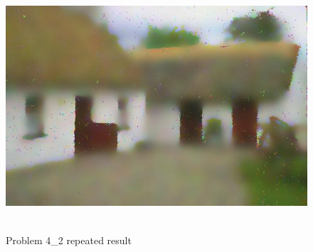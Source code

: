 \documentclass{article}
\begin{document}
\begin{figure}[!h]
  \centering
    \includegraphics[height=25em]{code/outputs/prob4_2_rep.jpg}
  \caption{Problem 4\_2 repeated result}
  \label{fig:output42rep}
\end{figure}
\end{document}
